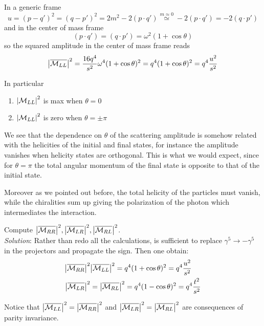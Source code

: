 \documentclass[TheoreticalPhy_ModB.tex]{subfiles}
\begin{document}
In a generic frame
\[
u = (p - q')^2 = (q - p')^2 = 2m^2 - 2(p\cdot q') \overset{m\approx0}{\simeq} -2(p\cdot q') = -2(q\cdot p')
\]
and in the center of mass frame
\[
(p \cdot q') = (q \cdot p') = \omega^2(1 + \cos \theta)
\]
so the squared amplitude in the center of mass frame reads
\[
\abs{\overline{\mathcal{M}_{LL}}}^2 = \frac{16q^4}{s^2} \omega^4 (1 + \cos \theta)^2 = q^4(1 + \cos \theta)^2 = q^4 \frac{u^2}{s^2}
\]

In particular
\begin{enumerate}
\item $\abs{\mathcal{M}_{LL}}^2$ is max when $\theta = 0$

\begin{center}

\end{center}

\item $\abs{\mathcal{M}_{LL}}^2$ is zero when $\theta = \pm\pi$

\begin{center}

\end{center}
 
\end{enumerate}

We see that the dependence on $\theta$ of the scattering amplitude is somehow related with the helicities of the initial and final states, for instance the amplitude vanishes when helicity states are orthogonal. This  is what we would expect, since for $\theta = \pi$ the total angular momentum of the final state is opposite to that of the initial state.

Moreover as we pointed out before, the total helicity of the particles must vanish, while the chiralities sum up giving the polarization of the photon which intermediates the interaction. 

\begin{exercise}
Compute $\abs{\overline{\mathcal{M}_{RR}}}^2, \abs{\overline{\mathcal{M}_{LR}}}^2, \abs{\overline{\mathcal{M}_{RL}}}^2$.\\

\textit{Solution}: Rather than redo all the calculations, is sufficient to replace $\gamma^5\to-\gamma^5$ in the projectors and propagate the sign. Then one obtain:
\[
\begin{split}
\abs{\overline{\mathcal{M}_{RR}}}^2 	& \abs{\overline{\mathcal{M}_{LL}}}^2 = q^4 (1 + \cos \theta)^2 = q^4 \frac{u^2}{s^2} \\
\abs{\overline{\mathcal{M}_{LR}}}^2	& = \abs{\overline{\mathcal{M}_{RL}}}^2 = q^4(1 - \cos \theta)^2 = q^4 \frac{t^2}{s^2}
\end{split}
\]

Notice that $\abs{\overline{\mathcal{M}_{LL}}}^2 = \abs{\overline{\mathcal{M}_{RR}}}^2$ and $\abs{\overline{\mathcal{M}_{LR}}}^2 = \abs{\overline{\mathcal{M}_{RL}}}^2$ are consequences of parity invariance.
\end{exercise}
\end{document}
